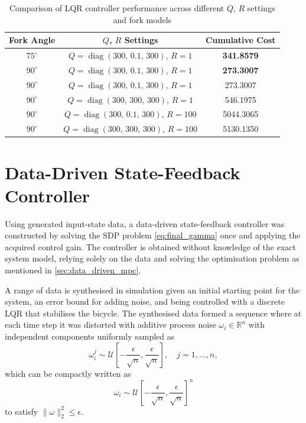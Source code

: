 \begin{table}[H]
	\centering
	\begin{tabular}{|c|c|c|}
		\hline
		\textbf{Fork Angle} & \textbf{\boldmath $Q$, $R$ Settings} & \textbf{Cumulative Cost} \\ \hline
		$75^\circ$ & $Q = \operatorname{diag}(300,\,0.1,\,300)$, $R = 1$ & \textbf{341.8579} \\ \hline
		$90^\circ$ & $Q = \operatorname{diag}(300,\,0.1,\,300)$, $R = 1$ & \textbf{273.3007} \\ \hline\hline
		$90^\circ$ & $Q = \operatorname{diag}(300,\,0.1,\,300)$, $R = 1$ & 273.3007 \\ \hline
		$90^\circ$ & $Q = \operatorname{diag}(300,\,300,\,300)$, $R = 1$ & 546.1975 \\ \hline
		$90^\circ$ & $Q = \operatorname{diag}(300,\,0.1,\,300)$, $R = 100$ & 5044.3065 \\ \hline
		$90^\circ$ & $Q = \operatorname{diag}(300,\,300,\,300)$, $R = 100$ & 5130.1350 \\ \hline
	\end{tabular}
	\caption{\boldmath Comparison of LQR controller performance across different $Q$, $R$ settings and fork models}
	\label{tab:LQR_controller_comparison}
\end{table}

\section{Data-Driven State-Feedback Controller}

Using generated input-state data, a data-driven state-feedback controller was constructed by solving the SDP problem \eqref{eq:final_gamma} once and applying the acquired control gain.
The controller is obtained without knowledge of the exact system model, relying solely on the data and solving the optimisation problem as mentioned in \autoref{sec:data_driven_mpc}.

A range of data is synthesised in simulation given an initial starting point for the system, an error bound for adding noise, and being controlled with a discrete LQR that stabilises the bicycle. The synthesised data formed a sequence where at each time step it was distorted with additive process noise $\omega_i \in \mathbb{R}^n$ with independent components uniformly sampled as \[
\omega_i^j \sim \mathcal{U}\left[-\frac{\epsilon}{\sqrt{n}}, \frac{\epsilon}{\sqrt{n}}\right], \quad j = 1, \ldots, n,
\]
which can be compactly written as
\[
\omega_i \sim \mathcal{U}\left[-\frac{\epsilon}{\sqrt{n}}, \frac{\epsilon}{\sqrt{n}}\right]^n
\]
to satisfy  $\|\omega\|^2_2 \leq \epsilon$.

